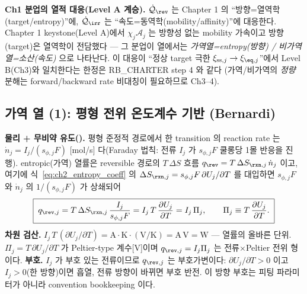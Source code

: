 \begin{keybox}
\textbf{Ch1 분업의 열적 대응(Level A 계승).} $\dot{\mathcal Q}_{\rev}$ 는 Chapter 1 의 ``방향=열역학(target/entropy)''에,
$\dot{\mathcal Q}_{\irr}$ 는 ``속도=동역학(mobility/affinity)''에 대응한다. Chapter 1 keystone(Level A)에서
$\chi_j\mathcal A_j$ 는 방향성 없는 mobility 가속이고 방향(target)은 열역학이 전담했다 — 그 분업이 열에서는
\emph{가역열=entropy(방향) / 비가역열=소산(속도)} 으로 나타난다. 이 대응이 ``정상 target 극한
$\xi_{\mathrm{ss},j}\to\xi_{\eq,j}$''에서 Level B(Ch3)와 일치한다는 한정은 RB\_CHARTER step 4 와 같다
(가역/비가역의 \emph{정량} 분해는 forward/backward rate 비대칭이 필요하므로 Ch3--4).
\end{keybox}

\subsection{가역 열 (1): 평형 전위 온도계수 기반 (Bernardi)}\label{sec:ch2_revOCV}
\textbf{물리 + 무비약 유도().} 평형 준정적 경로에서 한 transition 의 reaction rate 는
$\dot n_j=I_j/(s_{\phi,j}F)$ [mol/s] 다(Faraday 법칙: 전류 $I_j$ 가 $s_{\phi,j}F$ 쿨롱당 1몰 반응을 진행).
entropic(가역) 열률은 reversible 경로의 $T\,\Delta S$ 흐름 $q_\rev=T\,\Delta S_{\rxn,j}\,\dot n_j$ 이고, 여기에
식~\eqref{eq:ch2_entropy_coeff} 의 $\Delta S_{\rxn,j}=s_{\phi,j}F\,\partial U_j/\partial T$ 를 대입하면
$s_{\phi,j}F$ 와 $\dot n_j$ 의 $1/(s_{\phi,j}F)$ 가 상쇄되어
\begin{equation}
\boxed{\;q_{\rev,j}=T\,\Delta S_{\rxn,j}\,\frac{I_j}{s_{\phi,j}F}=I_j\,T\,\frac{\partial U_j}{\partial T}
=I_j\,\Pi_j,\qquad \Pi_j\equiv T\,\frac{\partial U_j}{\partial T}.\;}
\label{eq:ch2_qrev}
\end{equation}
\textbf{차원 검산.} $I_j\,T\,(\partial U_j/\partial T)=\mathrm A\cdot\mathrm K\cdot(\mathrm{V/K})=\mathrm{A\,V}=\mathrm W$
— 열률의 올바른 단위. $\Pi_j=T\,\partial U_j/\partial T$ 가 Peltier-type 계수[V]이며 $q_{\rev,j}=I_j\Pi_j$ 는
전류$\times$Peltier 전위 형이다. \textbf{부호.} $I_j$ 가 부호 있는 전류이므로 $q_{\rev,j}$ 는 부호가변이다:
$\partial U_j/\partial T>0$ 이고 $I_j>0$(한 방향)이면 흡열, 전류 방향이 바뀌면 부호 반전. 이 방향 부호는 피팅
파라미터가 아니라 convention bookkeeping 이다.

